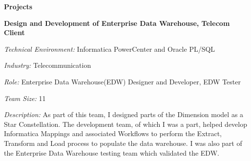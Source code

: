 \documentclass[a4paper,12pt,final]{memoir}
\newcommand{\SmallSep}{\vspace{0.5em}}
\newcommand{\CVSection}[1]
	{\Large\textbf{#1}\par
	\SmallSep\normalsize\normalfont}
\newcommand{\CVItem}[1]
	{\textbf{\color{Plum} #1}}
\begin{document}
\CVSection{Projects}
\CVItem{Design and Development of Enterprise Data Warehouse, Telecom Client}\SmallSep\\
\begin{minipage}{13cm}
	\begin{compactitem}[\color{Plum}$\circ$]
		{\footnotesize
			\item \emph{Technical Environment:} Informatica PowerCenter and Oracle PL/SQL
			\item \emph{Industry:} Telecommunication
			\item \emph{Role:} Enterprise Data Warehouse(EDW) Designer and Developer, EDW Tester
			\item \emph{Team Size:} 11
			\item \emph{Description:} As part of this team, I designed parts of the Dimension model as a Star Constellation. The development team, of which I was a part, helped develop Informatica Mappings and associated Workflows to perform the Extract, Transform and Load process to populate the data warehouse. I was also part of the Enterprise Data Warehouse testing team which validated the EDW.
		}
	\end{compactitem}
\end{minipage}
\SmallSep\\



\end{document}
